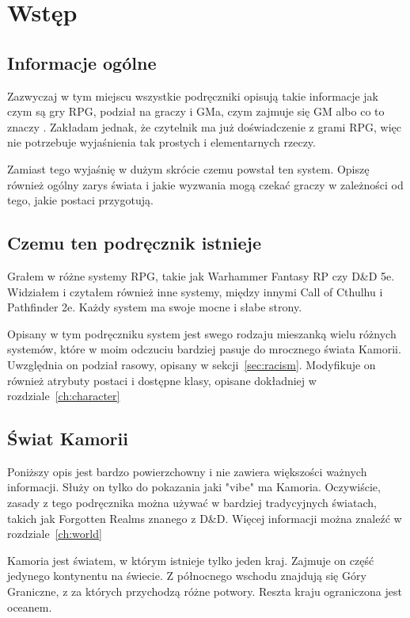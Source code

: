 \chapter{Wstęp}
\label{ch:intro}

\section{Informacje ogólne}
\label{sec:intro-general}

Zazwyczaj w tym miejscu wszystkie podręczniki opisują takie informacje jak czym
są gry RPG, podział na graczy i GMa, czym zajmuje się GM albo co to znaczy
. Zakładam jednak, że czytelnik ma już doświadczenie z grami RPG,
więc nie potrzebuje wyjaśnienia tak prostych i elementarnych rzeczy.

Zamiast tego wyjaśnię w dużym skrócie czemu powstał ten system. Opiszę również
ogólny zarys świata i jakie wyzwania mogą czekać graczy w zależności od tego,
jakie postaci przygotują.

\section{Czemu ten podręcznik istnieje}
\label{sec:intro-why}

Grałem w różne systemy RPG, takie jak Warhammer Fantasy RP czy D\&D 5e.
Widziałem i czytałem również inne systemy, między innymi Call of Cthulhu i
Pathfinder 2e. Każdy system ma swoje mocne i słabe strony.

Opisany w tym podręczniku system jest swego rodzaju mieszanką wielu różnych
systemów, które w moim odczuciu bardziej pasuje do mrocznego świata Kamorii.
Uwzględnia on podział rasowy, opisany w sekcji~\ref{sec:racism}. Modyfikuje on
również atrybuty postaci i dostępne klasy, opisane dokładniej w
rozdziale~\ref{ch:character}

\section{Świat Kamorii}
\label{sec:intro-world}

Poniższy opis jest bardzo powierzchowny i nie zawiera większości ważnych
informacji. Służy on tylko do pokazania jaki "vibe" ma Kamoria. Oczywiście,
zasady z tego podręcznika można używać w bardziej tradycyjnych światach, takich
jak Forgotten Realms znanego z D\&D. Więcej informacji można znaleźć w
rozdziale~\ref{ch:world}

Kamoria jest światem, w którym istnieje tylko jeden kraj. Zajmuje on część
jedynego kontynentu na świecie. Z północnego wschodu znajdują się Góry
Graniczne, z za których przychodzą różne potwory. Reszta kraju ograniczona jest
oceanem.

